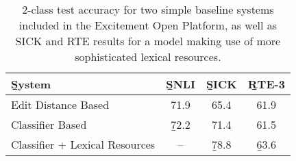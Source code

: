 %

%
%

\begin{table}
\begin{center}
\def\t#1{\small{#1}}
\begin{tabular}{l@{\hskip \colspaceL}c@{\hskip \colspaceL}c@{\hskip \colspaceL}c}
\toprule
\b{System} & \b{SNLI} & \b{SICK} & \b{RTE-3} \\
\midrule
\t{Edit Distance Based}            & \t{71.9} & \t{65.4} & \t{61.9} \\
\t{Classifier Based}               & \b{72.2} & \t{71.4} & \t{61.5} \\
\t{Classifier + Lexical Resources} & \t{--}   & \b{78.8} & \b{63.6} \\
\bottomrule
\end{tabular}
\end{center}
\caption{
\label{tab:eopresults}
2-class test accuracy for two simple baseline systems included in the
  Excitement Open Platform, as well as SICK and RTE results for
  a model making use of more sophisticated lexical resources.
}
\end{table}
%
%

